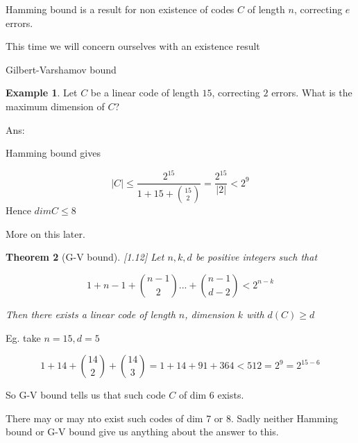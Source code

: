\documentclass[]{amsart}
\newtheorem{thm}{Theorem}[section]
\theoremstyle{definition}
\newtheorem{exmp}[thm]{Example}
\theoremstyle{remark}
\numberwithin{equation}{section}
\begin{document}
Hamming bound is a result for non existence of codes $C$ of length $n$, correcting $e$ errors.

This time we will concern ourselves with an existence result


Gilbert-Varshamov bound

\begin{exmp}
Let $C$ be a linear code of length $15$, correcting $2$ errors. What is the maximum dimension of $C$?

Ans:

Hamming bound gives

\[
	|C| \leq \frac{2^15}{1+15 +{15 \choose 2}} = \frac{2^15}{|2|} < 2^9
\]
Hence $dimC \leq 8$

More on this later.
\end{exmp}

\begin{thm}[G-V bound][1.12]
Let $n,k, d$ be positive integers such that

\[
	1 + n-1 + {n-1 \choose 2} ... + {n-1 \choose d-2} < 2^{n-k}
\]

Then there exists a linear code of length $n$, dimension $k$ with $d(C) \geq d$
\end{thm}

Eg. take $n=15, d=5$

\[
	1 + 14 + {14 \choose 2} + {14 \choose 3}  = 1 + 14 + 91 + 364 < 512 = 2^9 = 2^{15-6}
\]

So G-V bound tells us that such code $C$ of dim $6$ exists.

There may or may nto exist such codes of dim 7 or 8.
Sadly neither Hamming bound or G-V bound give us anything about the answer to this.
\end{document}
